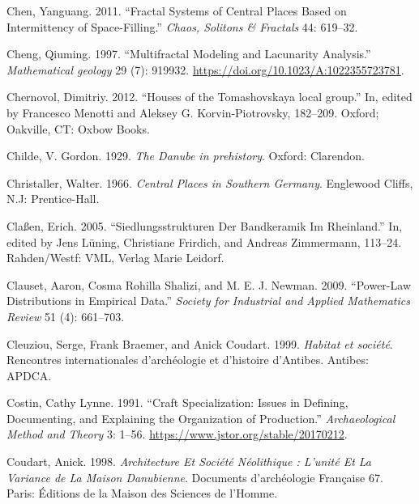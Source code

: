 \documentclass[
  12pt,
  a4paper, twoside]{book}
\newlength{\cslhangindent}
\newlength{\cslentryspacingunit} %
\newenvironment{CSLReferences}[2] %
 {%
  \setlength{\parindent}{0pt}
  \ifodd #1
  \let\oldpar\par
  \def\par{\hangindent=\cslhangindent\oldpar}
  \fi
  \setlength{\parskip}{#2\cslentryspacingunit}
 }%
 {}
\begin{document}
\begin{CSLReferences}{1}{0}
\leavevmode{}%
Chen, Yanguang. 2011. {``Fractal Systems of Central Places Based on Intermittency of Space-Filling.''} \emph{Chaos, Solitons \& Fractals} 44: 619--32.

\leavevmode{}%
Cheng, Qiuming. 1997. {``Multifractal Modeling and Lacunarity Analysis.''} \emph{Mathematical geology} 29 (7): 919932. \url{https://doi.org/10.1023/A:1022355723781}.

\leavevmode{}%
Chernovol, Dimitriy. 2012. {``Houses of the Tomashovskaya local group.''} In, edited by Francesco Menotti and Aleksey G. Korvin-Piotrovsky, 182--209. Oxford; Oakville, CT: Oxbow Books.

\leavevmode{}%
Childe, V. Gordon. 1929. \emph{The Danube in prehistory}. Oxford: Clarendon.

\leavevmode{}%
Christaller, Walter. 1966. \emph{Central Places in Southern {Germany}}. {Englewood Cliffs, N.J}: {Prentice-Hall}.

\leavevmode{}%
Claßen, Erich. 2005. {``Siedlungsstrukturen Der Bandkeramik Im Rheinland.''} In, edited by Jens Lüning, Christiane Frirdich, and Andreas Zimmermann, 113--24. Rahden/Westf: VML, Verlag Marie Leidorf.

\leavevmode{}%
Clauset, Aaron, Cosma Rohilla Shalizi, and M. E. J. Newman. 2009. {``Power-Law Distributions in Empirical Data.''} \emph{Society for Industrial and Applied Mathematics Review} 51 (4): 661--703.

\leavevmode{}%
Cleuziou, Serge, Frank Braemer, and Anick Coudart. 1999. \emph{Habitat et société}. Rencontres internationales d'archéologie et d'histoire d'Antibes. Antibes: APDCA.

\leavevmode{}%
Costin, Cathy Lynne. 1991. {``Craft Specialization: Issues in Defining, Documenting, and Explaining the Organization of Production.''} \emph{Archaeological Method and Theory} 3: 1--56. \url{https://www.jstor.org/stable/20170212}.

\leavevmode{}%
Coudart, Anick. 1998. \emph{Architecture Et Société Néolithique : L'unité Et La Variance de La Maison Danubienne}. Documents d'archéologie Française 67. Paris: Éditions de la Maison des Sciences de l'Homme.


\end{CSLReferences}
\end{document}
